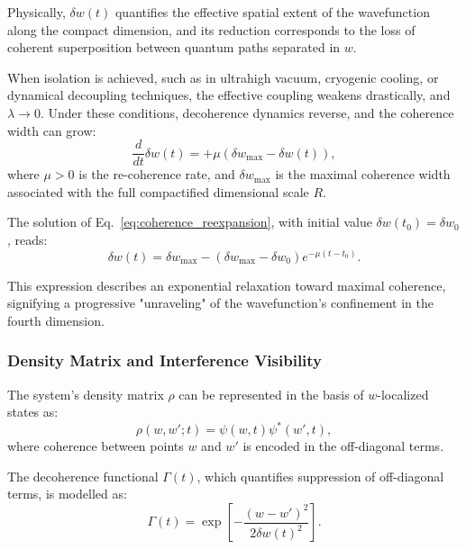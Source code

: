 \documentclass[12pt]{article}
\begin{document}
Physically, \(\delta w(t)\) quantifies the effective spatial extent of the wavefunction along the compact dimension, and its reduction corresponds to the loss of coherent superposition between quantum paths separated in \(w\).

When isolation is achieved, such as in ultrahigh vacuum, cryogenic cooling, or dynamical decoupling techniques, the effective coupling weakens drastically, and \(\lambda \rightarrow 0\). Under these conditions, decoherence dynamics reverse, and the coherence width can grow:
\begin{equation}
\frac{d}{dt} \delta w(t) = + \mu \left( \delta w_{\max} - \delta w(t) \right),
\label{eq:coherence_reexpansion}
\end{equation}
where \(\mu > 0\) is the re-coherence rate, and \(\delta w_{\max}\) is the maximal coherence width associated with the full compactified dimensional scale \(R\).

The solution of Eq.~\eqref{eq:coherence_reexpansion}, with initial value \(\delta w(t_0) = \delta w_0\), reads:
\begin{equation}
\delta w(t) = \delta w_{\max} - \left( \delta w_{\max} - \delta w_0 \right) e^{-\mu (t - t_0)}.
\label{eq:delta_w_solution_recovery}
\end{equation}

This expression describes an exponential relaxation toward maximal coherence, signifying a progressive "unraveling" of the wavefunction's confinement in the fourth dimension.

\subsubsection*{Density Matrix and Interference Visibility}

The system's density matrix \(\rho\) can be represented in the basis of \(w\)-localized states as:
\begin{equation}
\rho(w,w';t) = \psi(w,t) \psi^*(w',t),
\label{eq:density_matrix}
\end{equation}
where coherence between points \(w\) and \(w'\) is encoded in the off-diagonal terms.

The decoherence functional \(\Gamma(t)\), which quantifies suppression of off-diagonal terms, is modelled as:
\begin{equation}
\Gamma(t) = \exp \left[- \frac{(w - w')^2}{2 \delta w(t)^2} \right].
\label{eq:decoherence_functional}
\end{equation}
\end{document}
